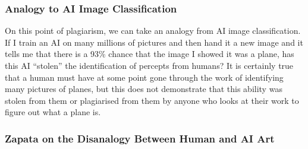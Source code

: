 \documentclass[11pt]{article}
\begin{document}
\subsubsection*{Analogy to AI Image Classification}
\label{sec:org90a20ac}
On this point of plagiarism, we can take an analogy from AI image classification. If I train an AI on many millions of pictures and then hand it a new image and it tells me that there is a 93\% chance that the image I showed it was a plane, has this AI ``stolen'' the identification of percepts from humans? It is certainly true that a human must have at some point gone through the work of identifying many pictures of planes, but this does not demonstrate that this ability was stolen from them or plagiarised from them by anyone who looks at their work to figure out what a plane is.

\subsubsection*{Zapata on the Disanalogy Between Human and AI Art}
\label{sec:org1a6c367}
\end{document}
